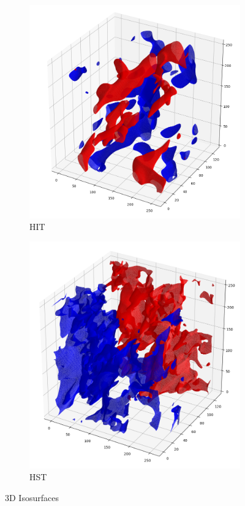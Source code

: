 \documentclass[12pt]{article}
\begin{document}
\begin{figure}[H]
\centering
\begin{subfigure}{0.5\linewidth}
\centering
\includegraphics[width=\linewidth]{./figures/12-hit.png}
\caption{HIT}
\end{subfigure}%
\begin{subfigure}{0.5\linewidth}
\centering
\includegraphics[width=\linewidth]{./figures/12-hst.png}
\caption{HST}
\end{subfigure}
\caption{3D Isosurfaces}
\label{fig:iso}
\end{figure}
\end{document}
